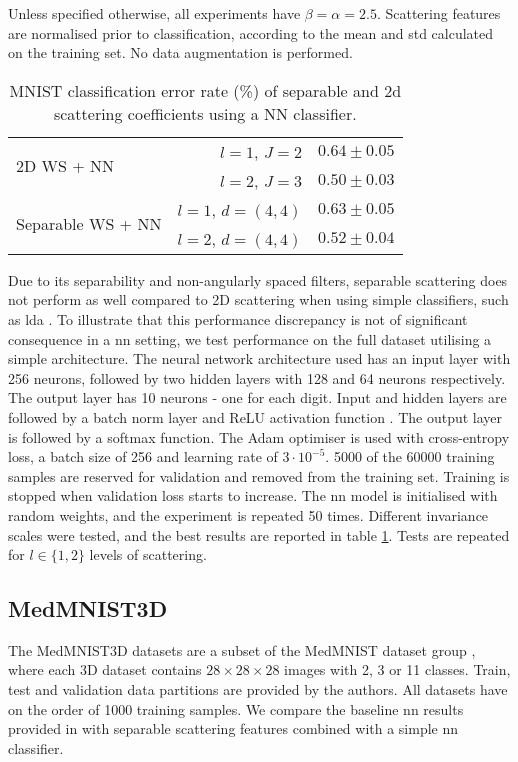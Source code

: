 Unless specified otherwise, all experiments have $\beta = \alpha = 2.5$. Scattering features are normalised prior to classification, according to the mean and \ac{std} calculated on the training set. No data augmentation is performed.

\begin{table}
\centering
\caption{MNIST classification error rate (\%) of separable and \ac{2d} scattering coefficients using a NN classifier.} \label{tab:mnistnn}
\begin{tabular}{|lr|l|} \hline
\multirow{2}{*}{2D WS + NN}        & $l=1$, $J=2$  & $0.64 \pm 0.05$    \\
          & $l=2$, $J=3$ & $0.50 \pm 0.03$     \\ \hline
\multirow{2}{*}{Separable WS + NN}  & $l=1$, $d=(4,4)$ & $0.63 \pm 0.05 $    \\
          & $l=2$, $d=(4,4)$  & $0.52 \pm 0.04$     \\ \hline
\end{tabular}
\end{table}

Due to its separability and non-angularly spaced filters, separable scattering does not perform as well compared to 2D scattering when using simple classifiers, such as \ac{lda} \cite{lda}. To illustrate that this performance discrepancy is not of significant consequence in a \ac{nn} setting, we test performance on the full dataset utilising a simple architecture. The neural network architecture used has an input layer with 256 neurons, followed by two hidden layers with 128 and 64 neurons respectively. The output layer has 10 neurons - one for each digit. Input and hidden layers are followed by a batch norm layer \cite{batchnorm} and ReLU activation function \cite{relu}. The output layer is followed by a softmax function. The Adam optimiser \cite{adam} is used with cross-entropy loss, a batch size of 256 and learning rate of $3 \cdot 10^{-5}$. 5000 of the 60000 training samples are reserved for validation and removed from the training set. Training is stopped when validation loss starts to increase. The \ac{nn} model is initialised with random weights, and the experiment is repeated 50 times. Different invariance scales were tested, and the best results are reported in table \ref{tab:mnistnn}. Tests are repeated for $l \in \{1, 2\}$ levels of scattering.





\subsection{MedMNIST3D}
The MedMNIST3D datasets are a subset of the MedMNIST dataset group \cite{medmnist}, where each 3D dataset contains $28\times 28 \times 28$ images with 2, 3 or 11 classes. Train, test and validation data partitions are provided by the authors. All datasets have on the order of 1000 training samples. We compare the baseline \ac{nn} results provided in \cite{medmnist} with separable scattering features combined with a simple \ac{nn} classifier.


